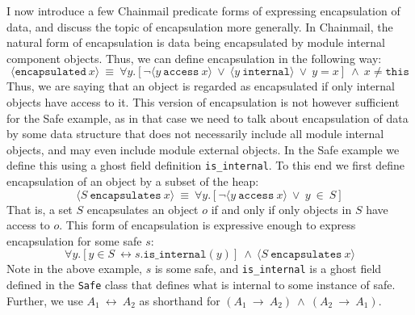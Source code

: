 \documentclass[12pt]{article}
\newcommand\encapsulated[1]{\langle \texttt{encapsulated}\ #1 \rangle}
\newcommand\encapsulates[2]{\langle #1\ \texttt{encapsulates}\ #2 \rangle}
\newcommand\access[2]{\langle #1\ \texttt{access}\ #2 \rangle}
\newcommand\internal[1]{\langle #1\ \texttt{internal}\rangle}
\numberwithin{case}{lemma}
\numberwithin{case}{theorem}
\numberwithin{subcase}{case}
\begin{document}
I now introduce a few Chainmail predicate
forms of expressing encapsulation of data, and
discuss the topic of encapsulation more generally.
In Chainmail, the natural form of encapsulation is 
data being encapsulated by module internal component objects. Thus, we can define encapsulation in the following way:
$$\encapsulated x\ \equiv\ \forall y.[\neg \access y x\ \vee\ \internal y\ \vee\ y = x]\ \wedge\ x \neq \texttt{this}$$
Thus, we are saying that an object is regarded as encapsulated
if only internal objects have access to it.
This version of encapsulation is not however sufficient for the Safe example, as 
in that case we need to talk about encapsulation of data by some data structure 
that does not necessarily include all module internal objects, and may even include 
module external objects. In the Safe example we define this using a ghost field definition \texttt{is\_internal}.
To this end we first define encapsulation of an object by a subset of the heap:
$$\encapsulates {S} {x}\ \equiv\ \forall y.[\neg \access y x\ \vee\ y\ \in\ S]$$
That is, a set $S$ encapsulates an object $o$ if and only if only objects in $S$
have access to $o$.
This form of encapsulation is expressive enough to express encapsulation for some safe $s$:
$$\forall y.[y \in S\ \longleftrightarrow s.\texttt{is\_internal}(y)]\ \wedge\ \encapsulates {S}{x}$$
Note in the above example, $s$ is some safe, and \texttt{is\_internal} is a ghost field defined 
in the \texttt{Safe} class that defines what is internal to some instance of safe.
Further, we use $A_1\ \longleftrightarrow\ A_2$ as shorthand for 
$(A_1\ \longrightarrow\ A_2)\ \wedge\ (A_2\ \longrightarrow\ A_1)$.
\end{document}
